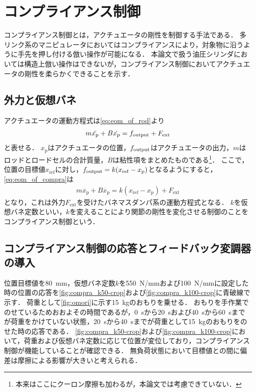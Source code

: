 \clearpage
\section{コンプライアンス制御}
コンプライアンス制御とは，アクチュエータの剛性を制御する手法である\cite{松野_大須賀_松原_野田_稲見201712,吉川198811,谷江和雄1989コンプライアンス制御と柔軟接触問題}．
多リンク系のマニピュレータにおいてはコンプライアンスにより，対象物に沿うように手先を押し付ける倣い操作が可能になる．
本論文で扱う油圧シリンダにおいては構造上倣い操作はできないが，コンプライアンス制御においてアクチュエータの剛性を柔らかくできることを示す．
\subsection{外力と仮想バネ}
アクチュエータの運動方程式は\eqnname\eqref{eq:eom_of_rod}より
\begin{align}
    \label{eq:eom_of_compra}
    m\ddot{x_\mathrm{p}} + B\dot{x_\mathrm{p}} = f_\mathrm{output} +F_\mathrm{ext}
\end{align}
と表せる．
$x_\mathrm{p}$はアクチュエータの位置，$f_\mathrm{output}$はアクチュエータの出力，$m$はロッドとロードセルの合計質量，$B$は粘性項をまとめたものである\footnote{本来はここにクーロン摩擦も加わるが，本論文では考慮できていない．}．
ここで，位置の目標値$x_\mathrm{ref}$に対し，$f_\mathrm{output} = k(x_\mathrm{ref}-x_\mathrm{p})$となるようにすると，\eqnname\eqref{eq:eom_of_compra}は
\begin{align}
    \label{eq:hoge}
    m\ddot{x_\mathrm{p}} + B\dot{x_\mathrm{p}} = k(x_\mathrm{ref}-x_\mathrm{p}) +F_\mathrm{ext}
\end{align}
となり，これは外力$F_\mathrm{ext}$を受けたバネマスダンパ系の運動方程式となる．
$k$を仮想バネ定数といい，$k$を変えることにより関節の剛性を変化させる制御のことをコンプライアンス制御という．

\subsection{コンプライアンス制御の応答とフィードバック変調器の導入}
位置目標値を\SI{80}{mm}，仮想バネ定数$k$を5\SI{50}{N/mm}および\SI{100}{N/mm}に設定した時の位置の応答を\figname\ref{fig:compra_k50-crop}および\figname\ref{fig:compra_k100-crop}に青破線で示す．
荷重として\figname\ref{fig:omori}に示す\SI{15}{kg}のおもりを乗せる．
おもりを手作業でのせているためおおよその時間であるが，\SI{0}{s}から\SI{20}{s}および\SI{40}{s}から\SI{60}{s}までが荷重をかけていない状態，\SI{20}{s}から\SI{40}{s}までが荷重として\SI{15}{kg}のおもりをのせた時の応答である．
\figname\ref{fig:compra_k50-crop}および\figname\ref{fig:compra_k100-crop}において，荷重および仮想バネ定数に応じて位置が変位しており，コンプライアンス制御が機能していることが確認できる．
無負荷状態において目標値との間に偏差は摩擦による影響が大きいと考えられる．

